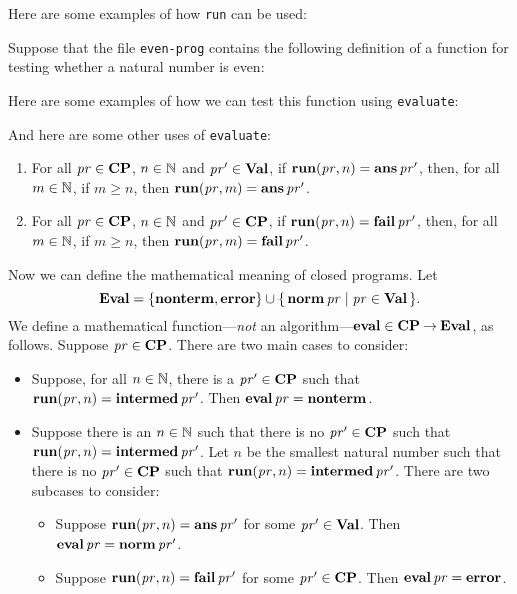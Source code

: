 Here are some examples of how \texttt{run} can be used:

Suppose that the file \texttt{even-prog} contains the following
definition of a function for testing whether a natural number is even:

Here are some examples of how we can test this function using
\texttt{evaluate}:

And here are some other uses of \texttt{evaluate}:


\begin{proposition}
\begin{enumerate}
\item For all $\mathit{pr}\in\mathbf{CP}$, $n\in\mathbb{N}$ and $\mathit{pr}'\in\mathbf{Val}$, if
  $\mathbf{run}(\mathit{pr},n) = \mathbf{ans}\,\mathit{pr}'$, then, for all $m\in\mathbb{N}$, if $m\geq n$,
  then $\mathbf{run}(\mathit{pr},m) = \mathbf{ans}\,\mathit{pr}'$.

\item For all $\mathit{pr}\in\mathbf{CP}$, $n\in\mathbb{N}$ and $\mathit{pr}'\in\mathbf{CP}$, if
  $\mathbf{run}(\mathit{pr},n) = \mathbf{fail}\,\mathit{pr}'$, then, for all $m\in\mathbb{N}$, if $m\geq n$,
  then $\mathbf{run}(\mathit{pr},m) = \mathbf{fail}\,\mathit{pr}'$.
\end{enumerate}
\end{proposition}

Now we can define the mathematical meaning of closed programs.
Let
\begin{displaymath}
\mathbf{Eval} = \{\mathbf{nonterm},\mathbf{error}\}\cup\{ \, \mathbf{norm}\,\mathit{pr} \mid \mathit{pr}\in\mathbf{Val} \, \} .  
\end{displaymath}
We define a mathematical function---\emph{not} an
algorithm---$\mathbf{eval}\in\mathbf{CP}\mathbin{\to}\mathbf{Eval}$, as follows.
Suppose $\mathit{pr}\in\mathbf{CP}$.  There are two main cases to consider:
\begin{itemize}
\item Suppose, for all $n\in\mathbb{N}$, there is a $\mathit{pr}'\in\mathbf{CP}$ such
  that $\mathbf{run}(\mathit{pr},n) = \mathbf{intermed}\,\mathit{pr}'$.  Then $\mathbf{eval}\,\mathit{pr} = \mathbf{nonterm}$.

\item Suppose there is an $n\in\mathbb{N}$ such that there is no
  $\mathit{pr}'\in\mathbf{CP}$ such that $\mathbf{run}(\mathit{pr},n) = \mathbf{intermed}\,\mathit{pr}'$.  Let $n$ be
  the smallest natural number such that there is no $\mathit{pr}'\in\mathbf{CP}$ such
  that $\mathbf{run}(\mathit{pr},n) = \mathbf{intermed}\,\mathit{pr}'$.  There are two subcases to
  consider:
  \begin{itemize}
  \item Suppose $\mathbf{run}(\mathit{pr},n) = \mathbf{ans}\,\mathit{pr}'$ for some $\mathit{pr}'\in\mathbf{Val}$.
    Then $\mathbf{eval}\,\mathit{pr} = \mathbf{norm}\,\mathit{pr}'$.

  \item Suppose $\mathbf{run}(\mathit{pr},n) = \mathbf{fail}\,\mathit{pr}'$ for some $\mathit{pr}'\in\mathbf{CP}$.
    Then $\mathbf{eval}\,\mathit{pr} = \mathbf{error}$.
  \end{itemize}
\end{itemize}


